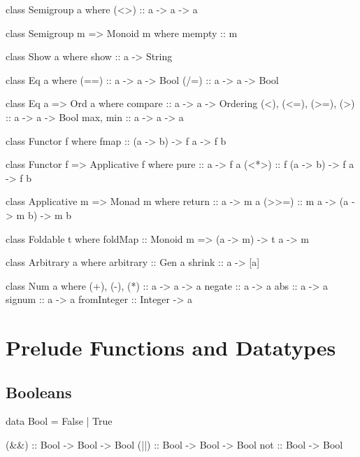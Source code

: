 \documentclass{article}
\begin{document}
\begin{hask}
  class Semigroup a where
    (<>)   :: a -> a -> a

  class Semigroup m => Monoid m where
    mempty :: m

  class  Show a  where
    show   :: a   -> String    

  class  Eq a  where
    (==)   :: a -> a -> Bool
    (/=)   :: a -> a -> Bool

  class Eq a => Ord a where
    compare :: a -> a -> Ordering
    (<), (<=), (>=), (>) :: a -> a -> Bool
    max, min             :: a -> a -> a

  class Functor f where
    fmap   :: (a -> b) -> f a -> f b

  class Functor f => Applicative f where
    pure   :: a -> f a
    (<*>)  :: f (a -> b) -> f a -> f b

  class Applicative m => Monad m where
    return :: a -> m a
    (>>=)  :: m a -> (a -> m b) -> m b

  class Foldable t where
    foldMap :: Monoid m => (a -> m) -> t a -> m

  class Arbitrary a where
    arbitrary :: Gen a
    shrink    :: a -> [a]

  class Num a where
    (+), (-), (*)       :: a -> a -> a
    negate              :: a -> a
    abs                 :: a -> a
    signum              :: a -> a
    fromInteger         :: Integer -> a
\end{hask}

\pagebreak

\section*{Prelude Functions and Datatypes}

\subsection*{Booleans}

\begin{hask}
data Bool = False | True

(&&) :: Bool -> Bool -> Bool 
(||) :: Bool -> Bool -> Bool 
not  :: Bool -> Bool
\end{hask}
\end{document}
